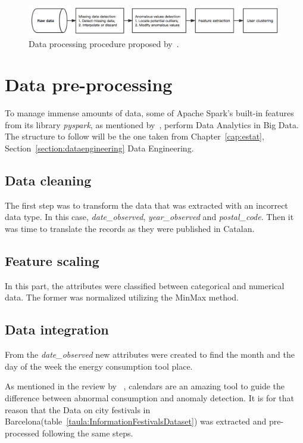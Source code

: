 \documentclass[a4paper,12pt,twoside]{ThesisStyle}
\begin{document}
\begin{figure}[hbt]
\centering
\includegraphics[width=13 cm]{imatges/dataProcessing.png}
\caption{\label{fig:dataProcessing} Data processing procedure proposed by~\cite{du2019clustering}.}
\end{figure}

\section{Data pre-processing}

To manage immense amounts of data, some of Apache Spark's built-in features from its library \textit{pyspark}, as mentioned by~\cite{liu2018scalable}, perform Data Analytics in Big Data. The structure to follow will be the one taken from Chapter~\ref{cap:estat}, Section~\ref{section:dataengineering} Data Engineering.

\subsection{Data cleaning}

The first step was to transform the data that was extracted with an incorrect data type. In this case, \textit{date\_observed}, \textit{year\_observed} and \textit{postal\_code}. Then it was time to translate the records as they were published in Catalan.

\subsection{Feature scaling}

In this part, the attributes were classified between categorical and numerical data. The former was normalized utilizing the MinMax method.

\subsection{Data integration}

From the \textit{date\_observed} new attributes were created to find the month and the day of the week the energy consumption tool place.

As mentioned in the review by ~\cite{moon2022toward}, calendars are an amazing tool to guide the difference between abnormal consumption and anomaly detection. It is for that reason that the Data on city festivals in Barcelona(table~\ref{taula:InformationFestivalsDataset}) was extracted and pre-processed following the same steps.
\end{document}

